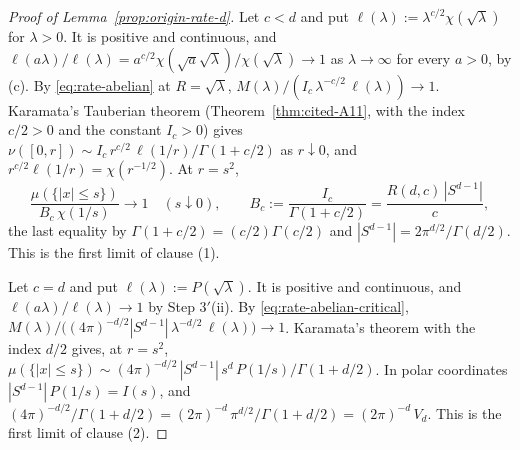 \begin{proof}[Proof of Lemma~\ref{prop:origin-rate-d}]
Let $c < d$ and put $\ell(\lambda) := \lambda^{c/2}\chi(\sqrt\lambda)$ for $\lambda > 0$. It is
positive and continuous, and
$\ell(a\lambda)/\ell(\lambda) = a^{c/2}\chi(\sqrt a\sqrt\lambda)/\chi(\sqrt\lambda) \to 1$ as
$\lambda \to \infty$ for every $a > 0$, by (c). By \ref{eq:rate-abelian} at $R = \sqrt\lambda$,
$M(\lambda)/(I_c\,\lambda^{-c/2}\,\ell(\lambda)) \to 1$. Karamata's Tauberian theorem
(Theorem~\ref{thm:cited-A11}, with the index $c/2 > 0$ and the constant $I_c > 0$) gives
$\nu([0,r]) \sim I_c\,r^{c/2}\,\ell(1/r)/\Gamma(1 + c/2)$ as $r \downarrow 0$, and
$r^{c/2}\ell(1/r) = \chi(r^{-1/2})$. At $r = s^2$,
\begin{equation}\label{eq:rate-ball}
  \frac{\mu(\{|x| \le s\})}{B_c\,\chi(1/s)} \to 1 \quad (s \downarrow 0),
  \qquad B_c := \frac{I_c}{\Gamma(1 + c/2)} = \frac{R(d,c)\,|S^{d-1}|}{c} ,
\end{equation}
the last equality by $\Gamma(1 + c/2) = (c/2)\Gamma(c/2)$ and $|S^{d-1}| = 2\pi^{d/2}/\Gamma(d/2)$.
This is the first limit of clause (1).

Let $c = d$ and put $\ell(\lambda) := P(\sqrt\lambda)$. It is positive and continuous, and
$\ell(a\lambda)/\ell(\lambda) \to 1$ by Step 3$'$(ii). By \ref{eq:rate-abelian-critical},
$M(\lambda)/\bigl((4\pi)^{-d/2}|S^{d-1}|\,\lambda^{-d/2}\,\ell(\lambda)\bigr) \to 1$. Karamata's
theorem with the index $d/2$ gives, at $r = s^2$,
$\mu(\{|x| \le s\}) \sim (4\pi)^{-d/2}\,|S^{d-1}|\,s^{d}\,P(1/s)/\Gamma(1 + d/2)$. In polar
coordinates $|S^{d-1}|\,P(1/s) = I(s)$, and
$(4\pi)^{-d/2}/\Gamma(1 + d/2) = (2\pi)^{-d}\,\pi^{d/2}/\Gamma(1 + d/2) = (2\pi)^{-d}\,V_d$. This is
the first limit of clause (2).


\end{proof}
